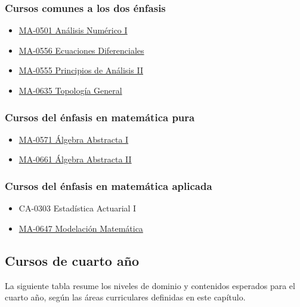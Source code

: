 \subsubsection*{Cursos comunes a los dos énfasis}

\begin{itemize}
    \item \hyperlink{MA0501}{MA-0501 Análisis Numérico I}
    \item \hyperlink{MA0556}{MA-0556 Ecuaciones Diferenciales}
    \item \hyperlink{MA0555}{MA-0555 Principios de Análisis II}
    \item \hyperlink{MA0635}{MA-0635 Topología General}
\end{itemize}

\subsubsection*{Cursos del énfasis en matemática pura}
\begin{itemize}
    \item \hyperlink{MA0571}{MA-0571 Álgebra Abstracta I}
    \item \hyperlink{MA0661}{MA-0661 Álgebra Abstracta II}
\end{itemize}

\subsubsection*{Cursos del énfasis en matemática aplicada}
\begin{itemize}
    \item {CA-0303 Estadística Actuarial I}
    \item \hyperlink{MA0647}{MA-0647 Modelación Matemática}
\end{itemize}

\subsection{Cursos de cuarto año}

La siguiente tabla resume los niveles de dominio y contenidos esperados para el cuarto año, según las áreas curriculares definidas en este capítulo.

